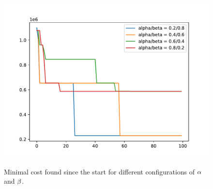 \begin{figure}[h]
	\begin{centering}
		{\includegraphics[scale=0.8]{figures/experiments/alpha_beta.pdf}}
		\caption{Minimal cost found since the start for different configurations of $\protect\alpha$ and $\protect\beta$.}
		\label{fig:alpha_beta}
	\end{centering}
\end{figure}
